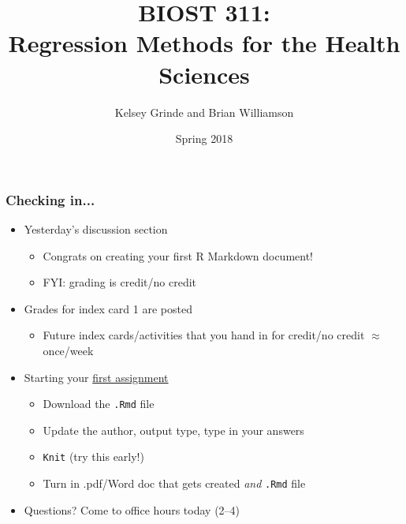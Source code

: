 \documentclass[12pt, 
hyperref={colorlinks=true, linkcolor=blue, urlcolor=cyan}]{beamer}
\title{BIOST 311: \\ Regression Methods for the Health Sciences}
\author{Kelsey Grinde and Brian Williamson}
\institute{UW Biostatistics}
\date{Spring 2018}
\begin{document}
\begin{frame}
\titlepage\thispagestyle{empty}
\end{frame}

\begin{frame}
\frametitle{Checking in...}
\begin{itemize}
\item Yesterday's discussion section %
	\begin{itemize}
	\item Congrats on creating your first R Markdown document!
	\item FYI: grading is credit/no credit
	\end{itemize}
\item Grades for index card 1 are posted %
	\begin{itemize}
	\item Future index cards/activities that you hand in for credit/no credit $\approx$ once/week
	\end{itemize}
\item Starting your \href{https://canvas.uw.edu/courses/1203588/assignments/4098142}{first assignment} %
	\begin{itemize}
	\item Download the \texttt{.Rmd} file
	\item Update the author, output type, type in your answers %
	\item \texttt{Knit} (try this early!) %
	\item Turn in .pdf/Word doc that gets created \textit{and} \texttt{.Rmd} file
	\end{itemize}
\item Questions? Come to office hours today (2--4) %
\end{itemize}
\end{frame}
\end{document}
